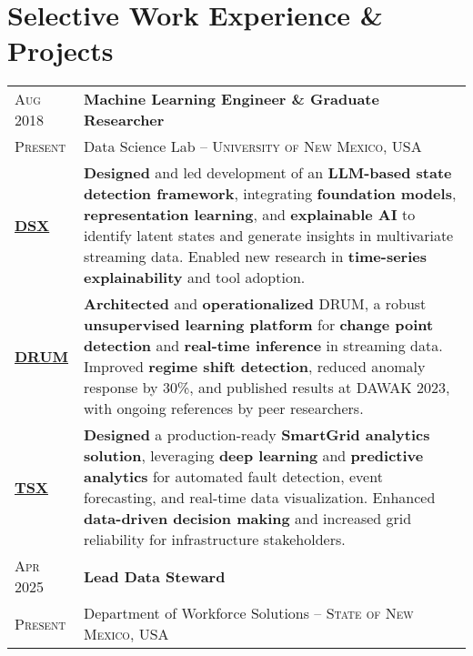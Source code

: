 \documentclass[10pt, letterpaper]{article}
\newcommand{\blueExtArrow}{\textsuperscript{\textcolor{primaryColor}{\tiny \faExternalLink*}}}
\newcommand{\edudate}[1]{\hspace{0.6em}#1}
\begin{document}

\section*{Selective Work Experience \& Projects}
\begin{tabularx}{\textwidth}{@{}L@{\hspace{1.2em}}J@{}} 

\edudate{\scshape Aug 2018} & \textbf{Machine Learning Engineer \& Graduate Researcher} \\
\edudate{\scshape Present} & Data Science Lab -- \textsc{University of New Mexico, USA}\\ [0.3em]

\edudate{\href{https://github.com/}{\textbf{DSX} \blueExtArrow}} &
\textbf{Designed} and led development of an \textbf{LLM-based state detection framework}, integrating \textbf{foundation models}, \textbf{representation learning}, and \textbf{explainable AI} to identify latent states and generate insights in multivariate streaming data. Enabled new research in \textbf{time-series explainability} and tool adoption. \\[2.7em]

\edudate{\href{https://github.com/}{\textbf{DRUM} \blueExtArrow}} &
\textbf{Architected} and \textbf{operationalized} DRUM, a robust \textbf{unsupervised learning platform} for \textbf{change point detection} and \textbf{real-time inference} in streaming data. Improved \textbf{regime shift detection}, reduced anomaly response by 30\%, and published results at DAWAK 2023, with ongoing references by peer researchers.\\[2.7em]

\edudate{\href{https://github.com/}{\textbf{TSX} \blueExtArrow}} &
\textbf{Designed} a production-ready \textbf{SmartGrid analytics solution}, leveraging \textbf{deep learning} and \textbf{predictive analytics} for automated fault detection, event forecasting, and real-time data visualization. Enhanced \textbf{data-driven decision making} and increased grid reliability for infrastructure stakeholders.\\[3.5em]

\edudate{\scshape Apr 2025} & \textbf{Lead Data Steward} \\
\edudate{\scshape Present} & Department of Workforce Solutions -- \textsc{State of New Mexico, USA}\\ [0.3em]


\end{tabularx}
\end{document}
